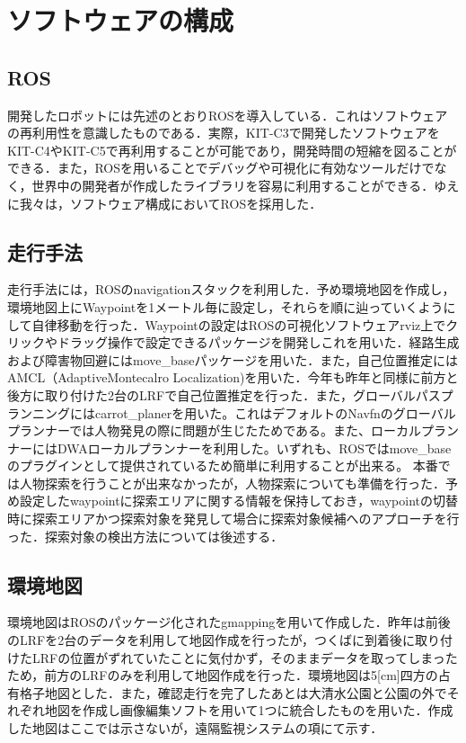 \documentclass[10pt,a4paper]{jarticle}
\begin{document}
\section{ソフトウェアの構成}
\subsection{ROS}
開発したロボットには先述のとおりROSを導入している．これはソフトウェアの再利用性を意識したものである．実際，KIT-C3で開発したソフトウェアをKIT-C4やKIT-C5で再利用することが可能であり，開発時間の短縮を図ることができる．また，ROSを用いることでデバッグや可視化に有効なツールだけでなく，世界中の開発者が作成したライブラリを容易に利用することができる．ゆえに我々は，ソフトウェア構成においてROSを採用した．
\subsection{走行手法}
走行手法には，ROSのnavigationスタックを利用した．予め環境地図を作成し，環境地図上にWaypointを1メートル毎に設定し，それらを順に辿っていくようにして自律移動を行った．Waypointの設定はROSの可視化ソフトウェアrviz上でクリックやドラッグ操作で設定できるパッケージを開発しこれを用いた．経路生成および障害物回避にはmove\_baseパッケージを用いた．また，自己位置推定にはAMCL（AdaptiveMontecalro Localization)を用いた．今年も昨年と同様に前方と後方に取り付けた2台のLRFで自己位置推定を行った．また，グローバルパスプランニングにはcarrot\_planerを用いた。これはデフォルトのNavfnのグローバルプランナーでは人物発見の際に問題が生じたためである。また、ローカルプランナーにはDWAローカルプランナーを利用した。いずれも、ROSではmove\_baseのプラグインとして提供されているため簡単に利用することが出来る。
本番では人物探索を行うことが出来なかったが，人物探索についても準備を行った．予め設定したwaypointに探索エリアに関する情報を保持しておき，waypointの切替時に探索エリアかつ探索対象を発見して場合に探索対象候補へのアプローチを行った．探索対象の検出方法については後述する．

\subsection{環境地図}
環境地図はROSのパッケージ化されたgmappingを用いて作成した．昨年は前後のLRFを2台のデータを利用して地図作成を行ったが，つくばに到着後に取り付けたLRFの位置がずれていたことに気付かず，そのままデータを取ってしまったため，前方のLRFのみを利用して地図作成を行った．環境地図は5[cm]四方の占有格子地図とした．また，確認走行を完了したあとは大清水公園と公園の外でそれぞれ地図を作成し画像編集ソフトを用いて1つに統合したものを用いた．作成した地図はここでは示さないが，遠隔監視システムの項にて示す．
\end{document}
